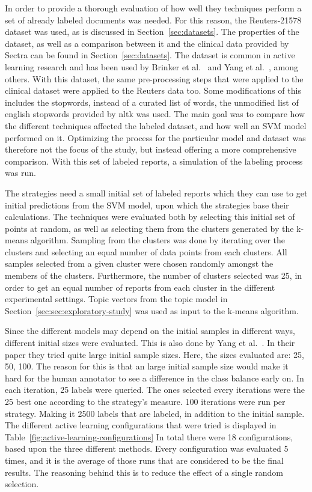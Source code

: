 In order to provide a thorough evaluation of how well they techniques perform a set of already labeled documents was needed.
For this reason, the Reuters-21578 dataset was used, as is discussed in Section~\ref{sec:datasets}. 
The properties of the dataset, as well as a comparison between it and the clinical data provided by Sectra can be found in Section~\ref{sec:datasets}.
The dataset is common in active learning research and has been used by Brinker et al\@.~\cite{brinker2006active} and Yang et al\@.~\cite{yang2009effective}, among others.
With this dataset, the same pre-processing steps that were applied to the clinical dataset were applied to the Reuters data too.
Some modifications of this includes the stopwords, instead of a curated list of words, the unmodified list of english stopwords provided by nltk was used.
The main goal was to compare how the different techniques affected the labeled dataset, and how well an SVM model performed on it.
Optimizing the process for the particular model and dataset was therefore not the focus of the study, but instead offering a more comprehensive comparison.
With this set of labeled reports, a simulation of the labeling process was run.

The strategies need a small initial set of labeled reports which they can use to get initial predictions from the SVM model, upon which the strategies base their calculations.
The techniques were evaluated both by selecting this initial set of points at random, as well as selecting them from the clusters generated by the k-means algorithm.
Sampling from the clusters was done by iterating over the clusters and selecting an equal number of data points from each clusters.
All samples selected from a given cluster were chosen randomly amongst the members of the clusters.
Furthermore, the number of clusters selected was 25, in order to get an equal number of reports from each cluster in the different experimental settings.
Topic vectors from the topic model in Section~\ref{sec:sec:exploratory-study} was used as input to the k-means algorithm.

Since the different models may depend on the initial samples in different ways, different initial sizes were evaluated.
This is also done by Yang et al\@.~\cite{yang2009effective}.
In their paper they tried quite large initial sample sizes.
Here, the sizes evaluated are: 25, 50, 100.
The reason for this is that an large initial sample size would make it hard for the human annotator to see a difference in the class balance early on.
In each iteration, 25 labels were queried.
The ones selected every iterations were the 25 best one according to the strategy's measure.
100 iterations were run per strategy.
Making it 2500 labels that are labeled, in addition to the initial sample.
The different active learning configurations that were tried is displayed in Table~\ref{fig:active-learning-configurations}
In total there were 18 configurations, based upon the three different methods.
Every configuration was evaluated 5 times, and it is the average of those runs that are considered to be the final results.
The reasoning behind this is to reduce the effect of a single random selection.


